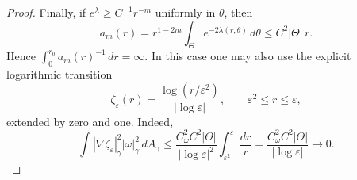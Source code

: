 \documentclass[10pt,a4paper]{amsart}
\begin{document}
\begin{proof}
Finally, if $e^\lambda\ge C^{-1}r^{-m}$ uniformly in $\theta$,
then
\[
a_m(r)
=r^{1-2m}\int_\Theta e^{-2\lambda(r,\theta)}\,d\theta
\le C^2|\Theta|\,r.
\]
Hence $\int_0^{r_0}a_m(r)^{-1}\,dr=\infty$.
In this case one may also use the explicit logarithmic transition
\[
\zeta_\varepsilon(r)=
\frac{\log(r/\varepsilon^2)}{|\log\varepsilon|},
\qquad
\varepsilon^2\le r\le\varepsilon,
\]
extended by zero and one. Indeed,
\[
\int |\nabla\zeta_\varepsilon|_\gamma^2
|\omega|_\gamma^2\,dA_\gamma
\le
\frac{C_\omega^2C^2|\Theta|}{|\log\varepsilon|^2}
\int_{\varepsilon^2}^{\varepsilon}\frac{dr}{r}
=
\frac{C_\omega^2C^2|\Theta|}{|\log\varepsilon|}
\longrightarrow0.
\]
\end{proof}
\end{document}
